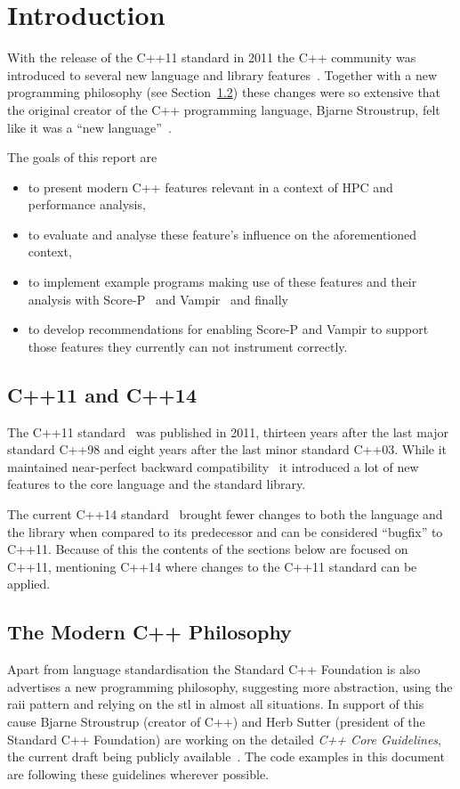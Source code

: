 \section{Introduction}\label{intro}

With the release of the C++11 standard in 2011 the C++ community was introduced to several new language and library features~\cite{cpp11std}. Together with a new programming philosophy (see Section~\ref{intro:philosophy}) these changes were so extensive that the original creator of the C++ programming language, Bjarne Stroustrup, felt like it was a ``new language''~\cite{tcpp}.

The goals of this report are
\begin{itemize}
\item to present modern C++ features relevant in a context of HPC and performance analysis,
\item to evaluate and analyse these feature's influence on the aforementioned context,
\item to implement example programs making use of these features and their analysis with Score-P~\cite{scorep} and Vampir~\cite{vampir} and finally
\item to develop recommendations for enabling Score-P and Vampir to support those features they currently can not instrument correctly.
\end{itemize}

\subsection{C++11 and C++14}\label{intro:cpp11_14}

The C++11 standard~\cite{cpp11std} was published in 2011, thirteen years after the last major standard C++98 and eight years after the last minor standard C++03. While it maintained near-perfect backward compatibility~\cite{cppfaq_learn} it introduced a lot of new features to the core language and the standard library.

The current C++14 standard~\cite{cpp14std} brought fewer changes to both the language and the library when compared to its predecessor and can be considered ``bugfix'' to C++11. Because of this the contents of the sections below are focused on C++11, mentioning C++14 where changes to the C++11 standard can be applied.

\subsection{The Modern C++ Philosophy}\label{intro:philosophy}

Apart from language standardisation the Standard C++ Foundation is also advertises a new programming philosophy, suggesting more abstraction, using the \gls{raii} pattern and relying on the \gls{stl} in almost all situations. In support of this cause Bjarne Stroustrup (creator of C++) and Herb Sutter (president of the Standard C++ Foundation) are working on the detailed \textit{C++ Core Guidelines}, the current draft being publicly available~\cite{cpp_guidelines}. The code examples in this document are following these guidelines wherever possible.
